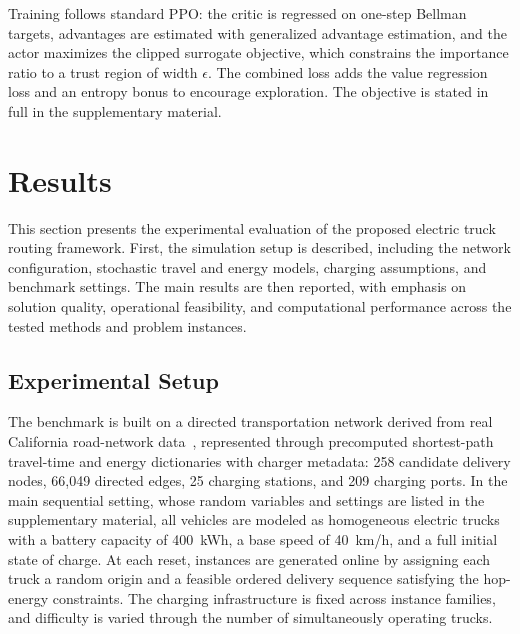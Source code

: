 \documentclass[journal]{IEEEtran}
\begin{document}
Training follows standard PPO: the critic is regressed on one-step Bellman targets, advantages are estimated with generalized advantage estimation, and the actor maximizes the clipped surrogate objective, which constrains the importance ratio to a trust region of width $\epsilon$. The combined loss adds the value regression loss and an entropy bonus to encourage exploration. The objective is stated in full in the supplementary material.












\section{Results}

This section presents the experimental evaluation of the proposed electric truck routing framework. First, the simulation setup is described, including the network configuration, stochastic travel and energy models, charging assumptions, and benchmark settings. The main results are then reported, with emphasis on solution quality, operational feasibility, and computational performance across the tested methods and problem instances.

\subsection{Experimental Setup}



The benchmark is built on a directed transportation network derived from real California road-network data~\cite{ziyan2025}, represented through precomputed shortest-path travel-time and energy dictionaries with charger metadata: 258 candidate delivery nodes, 66{,}049 directed edges, 25 charging stations, and 209 charging ports.
In the main sequential setting, whose random variables and settings are listed in the supplementary material, all vehicles are modeled as homogeneous electric trucks with a battery capacity of 400~kWh, a base speed of 40~km/h, and a full initial state of charge.  At each reset, instances are generated online by assigning each truck a random origin and a feasible ordered delivery sequence satisfying the hop-energy constraints. The charging infrastructure is fixed across instance families, and difficulty is varied through the number of simultaneously operating trucks.
\end{document}
